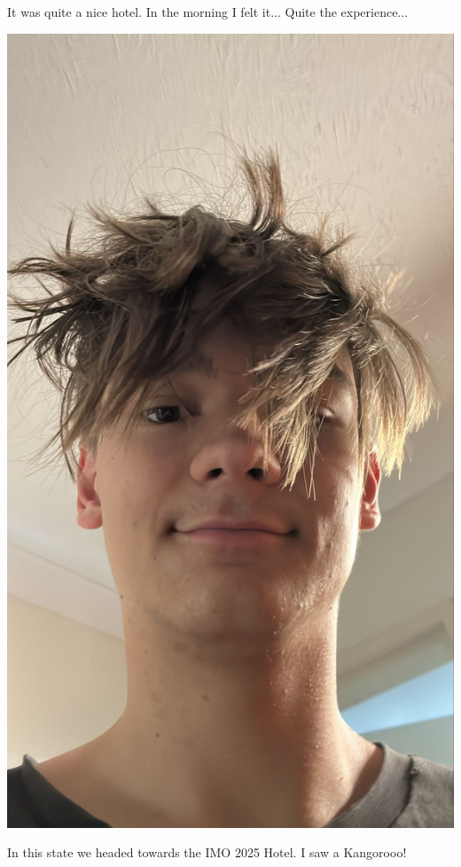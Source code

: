 \documentclass{article}
\begin{document}
\begin{center}
\end{center}

It was quite a nice hotel. In the morning I felt it... Quite the experience...

\begin{center}
  \includegraphics[scale=0.1]{assets/mornings.jpeg}
\end{center}

In this state we headed towards the IMO 2025 Hotel. I saw a Kangorooo!
\end{document}
